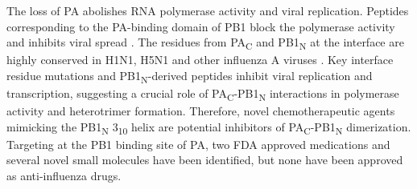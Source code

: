 The loss of PA abolishes RNA polymerase activity and viral replication. Peptides corresponding to the PA-binding domain of PB1 block the polymerase activity and inhibits viral spread \citep{1234,1575,1541,1586}.
The residues from PA\textsubscript{C} and PB1\textsubscript{N} at the interface are highly conserved in H1N1, H5N1 and other influenza A viruses \citep{1540,1575}.
Key interface residue mutations and PB1\textsubscript{N}-derived peptides inhibit viral replication and transcription, suggesting a crucial role of PA\textsubscript{C}-PB1\textsubscript{N} interactions in polymerase activity and heterotrimer formation. Therefore, novel chemotherapeutic agents mimicking the PB1\textsubscript{N} 3\textsubscript{10} helix are potential inhibitors of PA\textsubscript{C}-PB1\textsubscript{N} dimerization. Targeting at the PB1 binding site of PA, two FDA approved medications \citep{1576} and several novel small molecules \citep{1235,1550,1542,1587,1527} have been identified, but none have been approved as anti-influenza drugs.%
